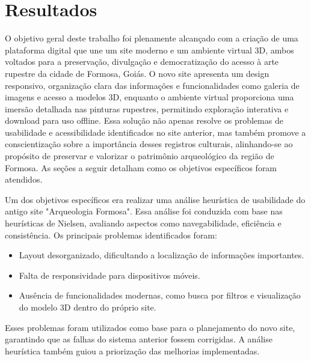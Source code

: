 \chapter{Resultados}
\label{cap:resultados}

O objetivo geral deste trabalho foi plenamente alcançado com a criação de uma plataforma digital que une um site moderno e um ambiente virtual 3D, ambos voltados para a preservação, divulgação e democratização do acesso à arte rupestre da cidade de Formosa, Goiás. O novo site apresenta um design responsivo, organização clara das informações e funcionalidades como galeria de imagens e acesso a modelos 3D, enquanto o ambiente virtual proporciona uma imersão detalhada nas pinturas rupestres, permitindo exploração interativa e download para uso offline. Essa solução não apenas resolve os problemas de usabilidade e acessibilidade identificados no site anterior, mas também promove a conscientização sobre a importância desses registros culturais, alinhando-se ao propósito de preservar e valorizar o patrimônio arqueológico da região de Formosa.
As seções a seguir detalham como os objetivos específicos foram atendidos.

\s{}
Um dos objetivos específicos era realizar uma análise heurística de usabilidade do antigo site "Arqueologia Formosa". Essa análise foi conduzida com base nas heurísticas de Nielsen, avaliando aspectos como navegabilidade, eficiência e consistência. Os principais problemas identificados foram:
\begin{itemize}
    \item Layout desorganizado, dificultando a localização de informações importantes.
    \item Falta de responsividade para dispositivos móveis.
    \item Ausência de funcionalidades modernas, como busca por filtros e visualização do modelo 3D dentro do próprio site.
\end{itemize}

Esses problemas foram utilizados como base para o planejamento do novo site, garantindo que as falhas do sistema anterior fossem corrigidas. A análise heurística também guiou a priorização das melhorias implementadas.

